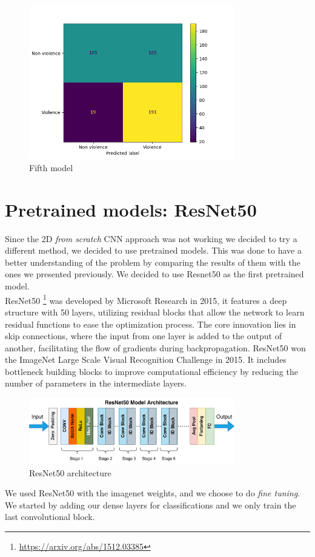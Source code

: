 \begin{figure}[]
    \centering
    \includegraphics[width=0.8\textwidth]{images/731a-2D10_inv-86ad-conf_matrix.png}
    \caption{Fifth model}
    \label{fig:FifthModelConfMatrix}
\end{figure}

\section{Pretrained models: ResNet50}
Since the 2D \textit{from scratch} CNN approach was not working we decided to try a different method, we decided to use pretrained models. This was done to have a better understanding of the problem by comparing the results of them with the ones we presented previously. We decided to use Resnet50 as the first pretrained model. \\

ResNet50 \footnote{\url{https://arxiv.org/abs/1512.03385}} was developed by Microsoft Research in 2015, it features a deep structure with 50 layers, utilizing residual blocks that allow the network to learn residual functions to ease the optimization process.
The core innovation lies in skip connections, where the input from one layer is added to the output of another, facilitating the flow of gradients during backpropagation.
ResNet50  won the ImageNet Large Scale Visual Recognition Challenge in 2015. It includes bottleneck building blocks to improve computational efficiency by reducing the number of parameters in the intermediate layers.
\begin{figure}[]
    \centering
    \includegraphics[width=0.8\textwidth]{images/ResNet50_architecture.png}
    \caption{ResNet50 architecture}
    \label{fig:ResNet50Arch}
\end{figure}
We used ResNet50 with the imagenet weights, and we choose to do 
\textit{fine tuning}. We started by adding our dense layers for classifications and we only train the last convolutional block.  

